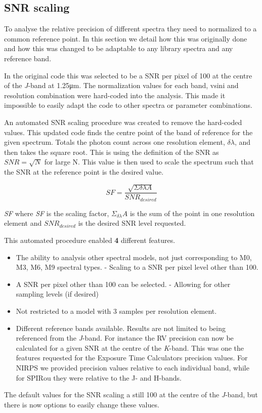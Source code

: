 \subsection{SNR scaling}
\label{subsec:snr_scaling}
To analyse the relative precision of different spectra they need to normalized to a common reference point. In this section we detail how this was originally done and how this was changed to be adaptable to any library spectra and any reference band.

In the original code this was selected to be a SNR per pixel of 100 at the centre of the \textit{J}-band at 1.25\si{\micro\meter}. The normalization values for each band, vsini and resolution combination were hard-coded into the analysis. This made it impossible to easily adapt the code to other spectra or parameter combinations.

An automated SNR scaling procedure was created to remove the hard-coded values. This updated code finds the centre point of the band of reference for the given spectrum. Totals the photon count across one resolution element, \(\delta\lambda\), and then takes the square root. This is using the definition of the SNR as \(SNR = \sqrt{N}\) for large N. This value is then used to scale the spectrum such that the SNR at the reference point is the desired value.

\begin{equation}
    SF =  \frac{\sqrt{\Sigma{\delta\lambda} A}} {SNR_{desired}}
\end{equation}

\textit{SF} where \textit{SF} is the scaling factor, \(\Sigma_{\delta\lambda} A\) is the sum of the point in one resolution element and \(SNR_{desired}\) is the desired SNR level requested.

This automated procedure enabled {\red{}\textbf{4}} different features.
\begin{itemize}
\item The ability to analysis other spectral models, not just corresponding to M0, M3, M6, M9 spectral types.
    - Scaling to a SNR per pixel level other than 100.
\item    A SNR per pixel other than 100 can be selected.
    - Allowing for other sampling levels (if desired)
\item      Not restricted to a model with 3 samples per resolution element.
\item Different reference bands available.
    Results are not limited to being referenced from the \textit{J}-band. For instance the RV precision can now be calculated for a given SNR at the centre of the \textit{K}-band. This was one the features requested for the Exposure Time Calculators precision values. For NIRPS we provided precision values relative to each individual band, while for SPIRou they were relative to the {J}- and {H}-bands.
\end{itemize}
The default values for the SNR scaling a still 100 at the centre of the \textit{J}-band, but there is now options to easily change these values.


